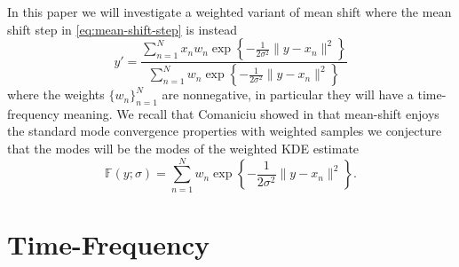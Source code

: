\documentclass[english]{article}
\begin{document}
In this paper we will investigate a weighted variant of mean shift where the mean shift step in \autoref{eq:mean-shift-step}
is instead
\begin{equation}\label{eq:weighted-mean-shift-step}
y' = \frac{\sum_{n=1}^N x_n w_n \exp\left\{-\frac{1}{2\sigma^2}\|y-x_n\|^2\right\}}{\sum_{n=1}^N w_n\exp\left\{-\frac{1}{2\sigma^2}\|y-x_n\|^2\right\}}
\end{equation}
where the weights $\{w_n\}_{n=1}^N$ are nonnegative, in particular they will have a time-frequency meaning.
We recall that Comaniciu showed in \cite{Comaniciu02} that mean-shift enjoys the standard mode convergence properties with
weighted samples we conjecture that the modes will be the modes of the weighted KDE estimate
\begin{equation}
\mathbb{F}(y; \sigma) = \sum_{n=1}^N w_n \exp\left\{-\frac{1}{2\sigma^2}\|y-x_n\|^2\right\}.
\end{equation}

\section{Time-Frequency}
\end{document}
